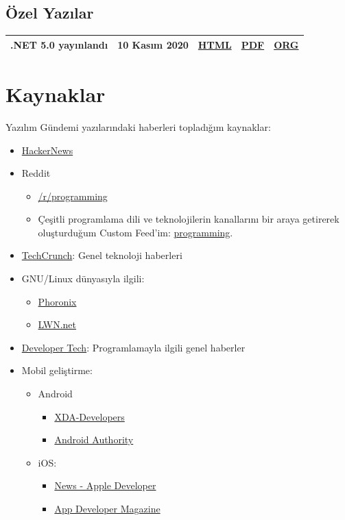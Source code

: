 \documentclass[11pt]{article}
\begin{document}
\subsection*{Özel Yazılar}
\label{sec:org64b1a45}
\begin{center}
\begin{tabular}{lllll}
\hline
.NET 5.0 yayınlandı & 10 Kasım 2020 & \href{arsiv/ozel-yazilar/dotnet-5-0/dotnet-5-0.html}{HTML} & \href{arsiv/ozel-yazilar/dotnet-5-0/dotnet-5-0.pdf}{PDF} & \href{arsiv/ozel-yazilar/dotnet-5-0/dotnet-5-0.org}{ORG}\\
\hline
\end{tabular}
\end{center}
\section*{Kaynaklar}
\label{sec:org2a0bcb1}
Yazılım Gündemi yazılarındaki haberleri topladığım kaynaklar:
\begin{itemize}
\item \href{https://news.ycombinator.com/news}{HackerNews}
\item Reddit
\begin{itemize}
\item \href{https://reddit.com/r/programming}{/r/programming}
\item Çeşitli programlama dili ve teknolojilerin kanallarını bir araya getirerek
oluşturduğum Custom Feed'im: \href{https://www.reddit.com/user/erenhatirnaz/m/programming/}{programming}.
\end{itemize}
\item \href{https://techcrunch.com/}{TechCrunch}: Genel teknoloji haberleri
\item GNU/Linux dünyasıyla ilgili:
\begin{itemize}
\item \href{https://www.phoronix.com}{Phoronix}
\item \href{https://lwn.net/}{LWN.net}
\end{itemize}
\item \href{https://developer-tech.com/}{Developer Tech}: Programlamayla ilgili genel haberler
\item Mobil geliştirme:
\begin{itemize}
\item Android
\begin{itemize}
\item \href{https://www.xda-developers.com/}{XDA-Developers}
\item \href{https://www.androidauthority.com/}{Android Authority}
\end{itemize}
\item iOS:
\begin{itemize}
\item \href{https://developer.apple.com/news/}{News - Apple Developer}
\item \href{https://appdevelopermagazine.com/iOS}{App Developer Magazine}
\end{itemize}
\end{itemize}
\end{itemize}
\end{document}
